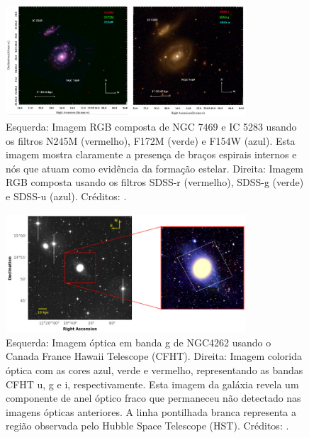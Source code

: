 \begin{figure}[h]
  \centering 
  \includegraphics[width=0.8\textwidth]{Imagens/ngc_ic.PNG} 
  \caption[Fotometria das galáxias em interação NGC 7469 e IC 5283.]{Esquerda: Imagem RGB composta de NGC 7469 e IC 5283 usando os filtros N245M (vermelho), F172M (verde) e F154W (azul). Esta imagem mostra claramente a presença de braços espirais internos e nós que atuam como evidência da formação estelar. Direita: Imagem RGB composta usando os filtros SDSS-r (vermelho), SDSS-g (verde) e SDSS-u (azul). Créditos: \cite{2024arXiv240412527S}.}
  \label{fig:ngc_ic} 
\end{figure}

\begin{figure}[h]
  \centering 
  \includegraphics[width=0.8\textwidth]{Imagens/ngcquiesc.PNG} 
  \caption[Fotometria da RG polar NGC 4262.]{Esquerda: Imagem óptica em banda g de NGC4262 usando o Canada France Hawaii Telescope (CFHT). Direita: Imagem colorida óptica com as cores azul, verde e vermelho, representando as bandas CFHT u, g e i, respectivamente. Esta imagem da galáxia revela um componente de anel óptico fraco que permaneceu não detectado nas imagens ópticas anteriores. A linha pontilhada branca representa a região observada pelo Hubble Space Telescope (HST). Créditos: \cite{2024MNRAS.530.2907A}.}
  \label{fig:ngcquiesc} 
\end{figure}

